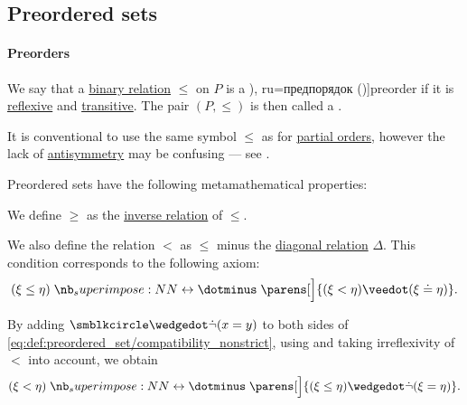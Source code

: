 \subsection{Preordered sets}\label{subsec:preordered_sets}

\paragraph{Preorders}

\begin{definition}\label{def:preordered_set}
  We say that a \hyperref[def:binary_relation]{binary relation} \( \leq \) on \( P \) is a \term[bg=преднаредба (\cite[9]{Проданов1982}), ru=предпорядок (\cite[def 3.1]{Гуров2013})]{preorder} if it is \hyperref[def:binary_relation/reflexive]{reflexive} and \hyperref[def:binary_relation/transitive]{transitive}. The pair \( (P, \leq) \) is then called a .

  It is conventional to use the same symbol \( \leq \) as for \hyperref[def:partially_ordered_set]{partial orders}, however the lack of \hyperref[def:binary_relation/antisymmetric]{antisymmetry} may be confusing --- see .

  Preordered sets have the following metamathematical properties:
  \begin{thmenum}[series=def:preordered_set]
     We define \( \geq \) as the \hyperref[def:binary_relation/inverse]{inverse relation} of \( \leq \).

     We also define the relation \( < \) as \( \leq \) minus the \hyperref[def:binary_relation/diagonal]{diagonal relation} \( \Delta \). This condition corresponds to the following axiom:
    \begin{equation}\label{eq:def:preordered_set/compatibility_nonstrict}
      (\xi \leq \eta) \syniff \parens[\Big]{(\xi < \eta) \synvee (\xi \syneq \eta)}.
    \end{equation}

    By adding \( \anon \synwedge \synneg (x = y) \) to both sides of \eqref{eq:def:preordered_set/compatibility_nonstrict}, using  and taking irreflexivity of \( < \) into account, we obtain
    \begin{equation}\label{eq:def:preordered_set/compatibility_strict}
      (\xi < \eta) \syniff \parens[\Big]{(\xi \leq \eta) \synwedge \synneg (\xi = \eta)}.
    \end{equation}


\end{thmenum}
\end{definition}
